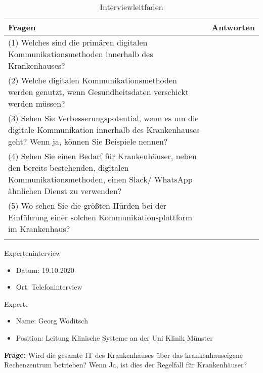 \begin{longtable}{p{12cm}|p{3cm}}
  \textbf{Fragen}                                                                                                                                           &   \textbf{Antworten}   \\ \hline
(1) Welches sind die primären digitalen Kommunikationsmethoden innerhalb des Krankenhauses?  &     \\ \hline
(2)	Welche digitalen Kommunikationsmethoden werden genutzt, wenn Gesundheitsdaten verschickt werden müssen?                                       &          \\ \hline
(3)	Sehen Sie Verbesserungspotential, wenn es um die digitale Kommunikation innerhalb des Krankenhauses geht? Wenn ja, können Sie Beispiele nennen?                                                            &       \\ \hline
(4)	Sehen Sie einen Bedarf für Krankenhäuser, neben den bereits bestehenden, digitalen Kommunikationsmethoden, einen Slack/ WhatsApp ähnlichen Dienst zu verwenden?                                                          &       \\ \hline
(5)	Wo sehen Sie die größten Hürden bei der Einführung einer solchen Kommunikationsplattform im Krankenhaus?                &          \\ \hline
\caption{Interviewleitfaden} 
\end{longtable}


Experteninterview
\begin{itemize}
  \item Datum: 19.10.2020
  \item Ort: Telefoninterview
\end{itemize}

Experte
\begin{itemize}
  \item Name: Georg Woditsch 
  \item Position: Leitung Klinische Systeme an der Uni Klinik Münster
\end{itemize}

\textbf{Frage: }Wird die gesamte IT des Krankenhauses über das krankenhauseigene Rechenzentrum betrieben?  Wenn Ja, ist dies der Regelfall für Krankenhäuser?

